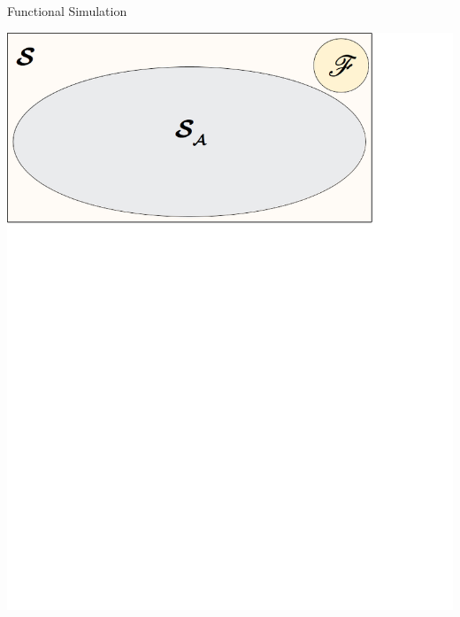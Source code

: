 \documentclass{beamer}
\begin{document}
\begin{frame}{Functional Simulation}
\begin{center}
\includegraphics[scale=0.55]{Images/sd2.png}
\end{center}
\end{frame}
\end{document}
